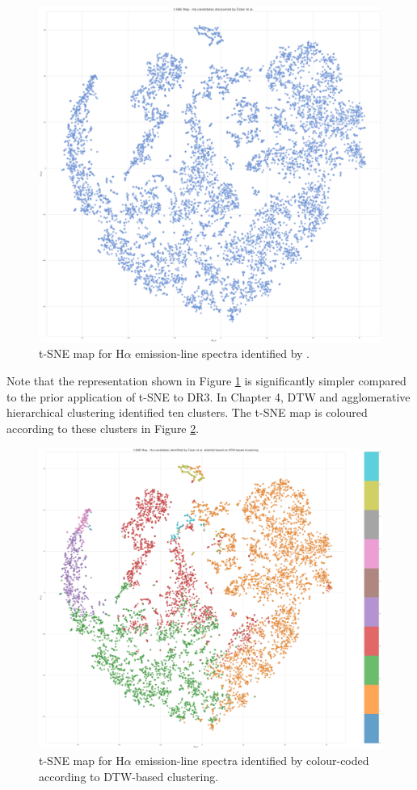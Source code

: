 \begin{figure}[!htb]
\centering
\includegraphics[scale=0.12]{figures/t-sne cotar et al.png}
\caption{t-SNE map for H$\alpha$ emission-line spectra identified by \citet{vcotar2021galah}.}
\label{fig5.4}
\end{figure}
Note that the representation shown in Figure \ref{fig5.4} is significantly simpler compared to the prior application of t-SNE to DR3. In Chapter 4, DTW and agglomerative hierarchical clustering identified ten clusters. The t-SNE map is coloured according to these clusters in Figure \ref{fig5.5}.
\begin{figure}[!htb]
\centering
\includegraphics[scale=0.16]{figures/t-sne colored by dtw.png}
\caption{t-SNE map for H$\alpha$ emission-line spectra identified by \citet{vcotar2021galah} colour-coded according to DTW-based clustering.}
\label{fig5.5}
\end{figure}
